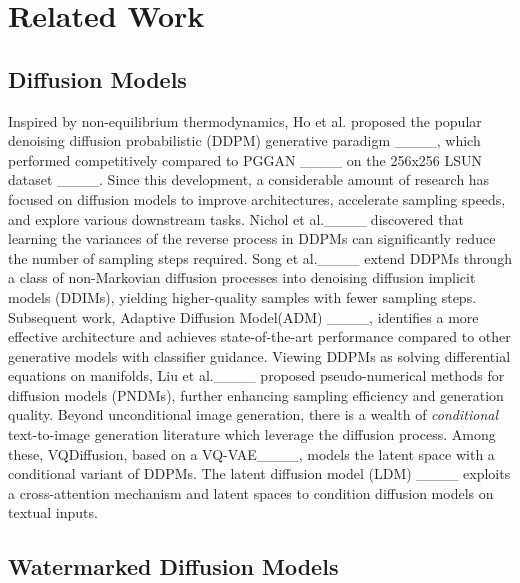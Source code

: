 \section{Related Work}
\subsection{Diffusion Models}

Inspired by non-equilibrium thermodynamics, Ho et al. proposed the popular denoising diffusion probabilistic (DDPM) generative paradigm ____, which performed competitively compared to PGGAN ____ on the 256x256 LSUN dataset ____. Since this development, a considerable amount of research has focused on diffusion models to improve architectures, accelerate sampling speeds, and explore various downstream tasks. Nichol et al.____ discovered that learning the variances of the reverse process in DDPMs can significantly reduce the number of sampling steps required. Song et al.____ extend DDPMs through a class of non-Markovian diffusion processes into denoising diffusion implicit models (DDIMs), yielding higher-quality samples with fewer sampling steps. Subsequent work, Adaptive Diffusion Model(ADM) ____, identifies a more effective architecture and achieves state-of-the-art performance compared to other generative models with classifier guidance. Viewing DDPMs as solving differential equations on manifolds, Liu et al.____ proposed pseudo-numerical methods for diffusion models (PNDMs), further enhancing sampling efficiency and generation quality. Beyond unconditional image generation, there is a wealth of \textit{conditional} text-to-image generation literature which leverage the diffusion process. Among these, VQDiffusion, based on a VQ-VAE____, models the latent space with a conditional variant of DDPMs. The latent diffusion model (LDM) ____ exploits a cross-attention mechanism and latent spaces to condition diffusion models on textual inputs.



\subsection{Watermarked Diffusion Models}






